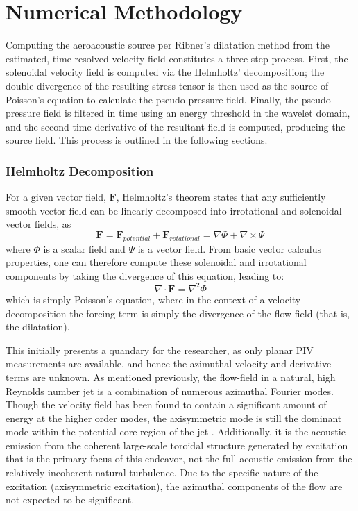 \section{Numerical Methodology}
Computing the aeroacoustic source per Ribner's dilatation method from the estimated, time-resolved velocity field constitutes a three-step process. 
First, the solenoidal velocity field is computed via the Helmholtz' decomposition; the double divergence of the resulting stress tensor is then used as the source of Poisson's equation to calculate the pseudo-pressure field. 
Finally, the pseudo-pressure field is filtered in time using an energy threshold in the wavelet domain, and the second time derivative of the resultant field is computed, producing the source field.
This process is outlined in the following sections.
\subsubsection{Helmholtz Decomposition}
For a given vector field, $\mathbf{F}$, Helmholtz's theorem states that any sufficiently smooth vector field can be linearly decomposed into irrotational and solenoidal vector fields, as
\begin{equation}
\mathbf{F} = \mathbf{F}_{potential} + \mathbf{F}_{rotational} = \nabla \Phi + \nabla \times \Psi
\end{equation}
where $\Phi$ is a scalar field and $\Psi$ is a vector field.
From basic vector calculus properties, one can therefore compute these solenoidal and irrotational components by taking the divergence of this equation, leading to:
\begin{equation}
\nabla \cdot \mathbf{F} = \nabla^{2} \Phi
\end{equation}
which is simply Poisson's equation, where in the context of a velocity decomposition the forcing term is simply the divergence of the flow field (that is, the dilatation).

This initially presents a quandary for the researcher, as only planar PIV measurements are available, and hence the azimuthal velocity and derivative terms are unknown.
As mentioned previously, the flow-field in a natural, high Reynolds number jet is a combination of numerous azimuthal Fourier modes.
Though the velocity field has been found to contain a significant amount of energy at the higher order modes, the axisymmetric mode is still the dominant mode within the potential core region of the jet \citep{Glauser1987}.
Additionally, it is the acoustic emission from the coherent large-scale toroidal structure generated by excitation that is the primary focus of this endeavor, not the full acoustic emission from the relatively incoherent natural turbulence.
Due to the specific nature of the excitation (axisymmetric excitation), the azimuthal components of the flow are not expected to be significant.

